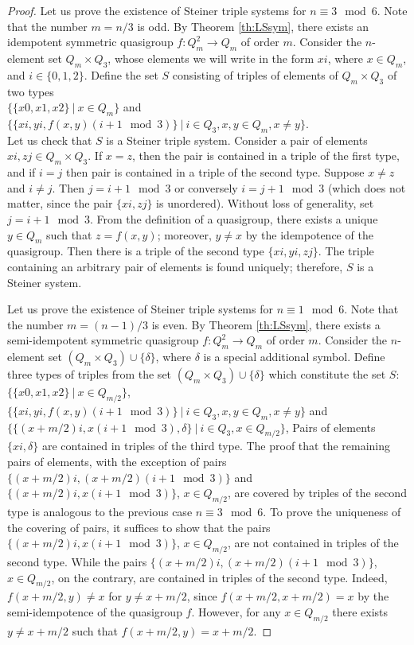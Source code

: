 \documentclass[11pt]{article}
\theoremstyle{definition}
\begin{document}
{{{\begin{proof}
Let us prove the existence of Steiner triple systems for $n\equiv 3\mod 6$.
Note that the number $m=n/3$ is odd. By Theorem \ref{th:LSsym},
there exists an idempotent symmetric quasigroup
$f:Q_m^2\rightarrow Q_m$ of order $m$. Consider the $n$-element
set $Q_m\times Q_3$, whose elements we will write in the form
$xi$, where $x\in Q_m$, and $i\in\{0,1,2\}$. Define the set $S$
consisting of triples of elements of $Q_m\times
Q_3$ of two types\\ $\{\{x0,x1,x2\} \ |\ x\in Q_m\}$ and\\
$\{\{xi,yi,f(x,y)(i+1\mod 3)\} \ |\ i\in Q_3, x,y\in Q_m, x\neq
y\}$.\\ Let us check that $S$
is a Steiner triple system. Consider a pair of elements $xi,zj\in Q_m\times
Q_3$. If $x=z$, then the pair is contained in a triple of the first type, and if
$i=j$ then pair is contained in a triple  of the second type. Suppose $x\neq z$ and $i\neq j$. Then $j=i+1\mod 3$
or conversely $i=j+1\mod 3$ (which does not matter, since the pair
$\{xi,zj\}$ is unordered). Without loss of generality, set $j=i+1\mod
3$. From the definition of a quasigroup, there exists a unique $y\in Q_m$
such that $z=f(x,y)$; moreover, $y\neq x$ by the idempotence
of the quasigroup. Then there is a triple of the second type $\{xi,yi,zj\}$.
The triple containing an arbitrary pair of elements is found
uniquely; therefore, $S$ is a Steiner system.

Let us prove the existence of Steiner triple systems for $n\equiv 1\mod 6$.
Note that the number $m=(n-1)/3$ is even. By Theorem \ref{th:LSsym},
there exists a semi-idempotent symmetric quasigroup
$f:Q_m^2\rightarrow Q_m$ of order $m$. Consider the $n$-element
set $(Q_m\times Q_3)\cup\{ \delta\}$, where $\delta$ is a
special additional symbol. Define three types  of triples from the set  $(Q_m\times Q_3)\cup\{ \delta\}$  which constitute the set $S$:\\
$\{\{x0,x1,x2\} \ |\ x\in Q_{m/2}\}$,\\ $\{\{xi,yi,f(x,y)(i+1\mod
3)\} \ |\ i\in Q_3, x,y\in Q_m, x\neq y\}$ and \\
$\{\{(x+m/2)i,x(i+1\mod 3),\delta\} \ |\ i\in Q_3, x\in Q_{m/2}\}$, 
Pairs of elements $\{xi,\delta\}$ are contained in triples of the third type.
The proof that the remaining pairs of elements, with the exception of
pairs\\ $\{(x+m/2)i,(x+m/2)(i+1\mod 3)\}$ and \\ $\{(x+m/2)i,x(i+1\mod 3)\}$, $x\in Q_{m/2}$, are covered by triples of the second type is analogous to
the previous case $n\equiv 3\mod 6$. To prove the
uniqueness of the covering of pairs, it suffices to show that the pairs
$\{(x+m/2)i,x(i+1\mod 3)\}$, $x\in Q_{m/2}$, are not contained in triples of
the second type. While the pairs $\{(x+m/2)i,(x+m/2)(i+1\mod 3)\}$,
$x\in Q_{m/2}$, on the contrary, are contained in triples of the second type.
Indeed, $f(x+m/2,y)\neq x$ for $y\neq x+m/2$, since
$f(x+m/2,x+m/2)= x$ by the semi-idempotence of the quasigroup $f$. However, for
any $x\in Q_{m/2}$ there exists $y\neq x+m/2$ such that
$f(x+m/2,y)=x+m/2$.
\end{proof}

}}}
\end{document}
